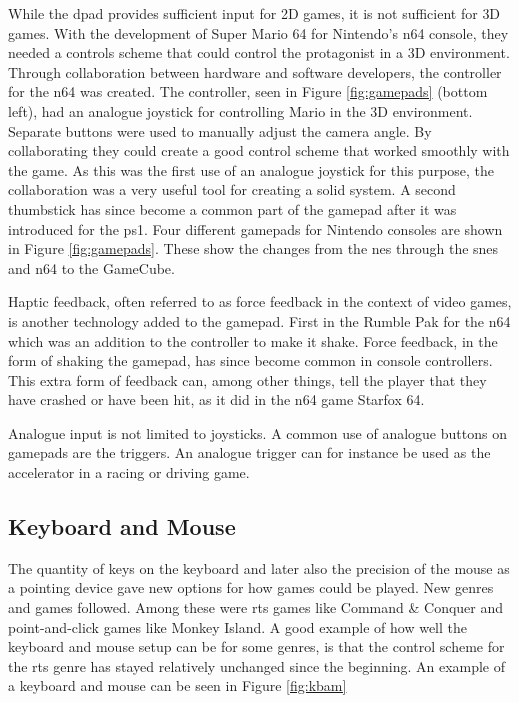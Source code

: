 
While the \gls{dpad} provides sufficient input for 2D games, it is not sufficient for 3D games.
With the development of Super Mario 64 for Nintendo's \gls{n64} console, they needed a controls scheme that could control the protagonist in a 3D environment.
Through collaboration between hardware and software developers, the controller for the \gls{n64} was created.
The controller, seen in Figure \ref{fig:gamepads} (bottom left), had an analogue joystick for controlling Mario in the 3D environment. %
Separate buttons were used to manually adjust the camera angle.
By collaborating they could create a good control scheme that worked smoothly with the game.
As this was the first use of an analogue joystick for this purpose, the collaboration was a very useful tool for creating a solid system.
A second thumbstick has since become a common part of the gamepad after it was introduced for the \gls{ps1}.
Four different gamepads for Nintendo consoles are shown in Figure \ref{fig:gamepads}.
These show the changes from the \gls{nes} through the \gls{snes} and \gls{n64} to the GameCube.

Haptic feedback, often referred to as force feedback in the context of video games, is another technology added to the gamepad.
First in the Rumble Pak for the \gls{n64} which was an addition to the controller to make it shake.
Force feedback, in the form of shaking the gamepad, has since become common in console controllers.
This extra form of feedback can, among other things, tell the player that they have crashed or have been hit, as it did in the \gls{n64} game Starfox 64.

Analogue input is not limited to joysticks.
A common use of analogue buttons on gamepads are the triggers.
An analogue trigger can for instance be used as the accelerator in a racing or driving game.


\subsection{Keyboard and Mouse}
The quantity of keys on the keyboard and later also the precision of the mouse as a pointing device gave new options for how games could be played.
New genres and games followed.
Among these were \gls{rts} games like Command \& Conquer and point-and-click games like Monkey Island.
A good example of how well the keyboard and mouse setup can be for some genres, is that the control scheme for the \gls{rts} genre has stayed relatively unchanged since the beginning. An example of a keyboard and mouse can be seen in Figure \ref{fig:kbam}

